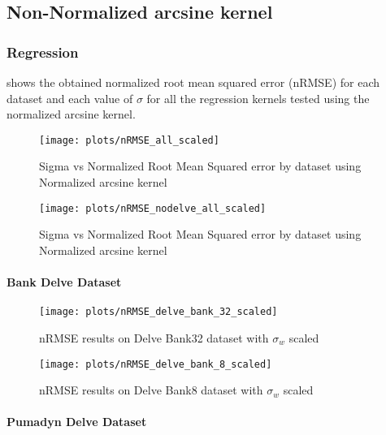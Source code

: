 
\subsection{Non-Normalized arcsine kernel}

\subsubsection{Regression}

 shows the obtained normalized root mean
squared error (nRMSE) for each dataset and each value of $\sigma$ for all the
regression kernels tested using the normalized arcsine kernel.

\begin{figure}[H]
    \texttt{[image: plots/nRMSE\_all\_scaled]}
    \caption{Sigma vs Normalized Root Mean Squared error by dataset using Normalized arcsine kernel}%
    \label{fig:nrmse-all-scaled}
\end{figure}

\begin{figure}[H]
    \texttt{[image: plots/nRMSE\_nodelve\_all\_scaled]}
    \caption{Sigma vs Normalized Root Mean Squared error by dataset using Normalized arcsine kernel}%
    \label{fig:nrmse-all-scaled}
\end{figure}

\paragraph{Bank Delve Dataset}


\begin{figure}[H]
    \texttt{[image: plots/nRMSE\_delve\_bank\_32\_scaled]}
    \caption{nRMSE results on Delve Bank32 dataset with $\sigma_w$ scaled}
    \label{fig:nrmse-delve-all-bank-32-scaled}
\end{figure}

\begin{figure}[H]
    \texttt{[image: plots/nRMSE\_delve\_bank\_8\_scaled]}
    \caption{nRMSE results on Delve Bank8 dataset with $\sigma_w$ scaled}
    \label{fig:nrmse-delve-bank-8-scaled}
\end{figure}


\paragraph{Pumadyn Delve Dataset}

